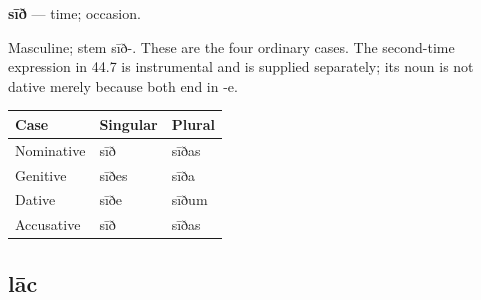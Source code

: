 \par\begin{minipage}{\linewidth}\raggedright
\textbf{sīð} — time; occasion.

Masculine; stem sīð-. These are the four ordinary cases. The second-time expression in 44.7 is instrumental and is supplied separately; its noun is not dative merely because both end in -e.

\par\begingroup
\fontsize{10.5}{13.2}\selectfont
\setlength{\LTleft}{0pt}\setlength{\LTright}{\fill}
\noindent
\begin{tabular}{@{}>{\raggedright\arraybackslash}p{39.46mm}>{\raggedright\arraybackslash}p{39.46mm}>{\raggedright\arraybackslash}p{39.46mm}@{}}
\toprule
\textbf{Case} & \textbf{Singular} & \textbf{Plural} \\
\midrule
Nominative & sīð & sīðas \\
Genitive & sīðes & sīða \\
Dative & sīðe & sīðum \\
Accusative & sīð & sīðas \\
\bottomrule
\end{tabular}
\par\endgroup

\end{minipage}\par
{}
\subsection*{lāc}

